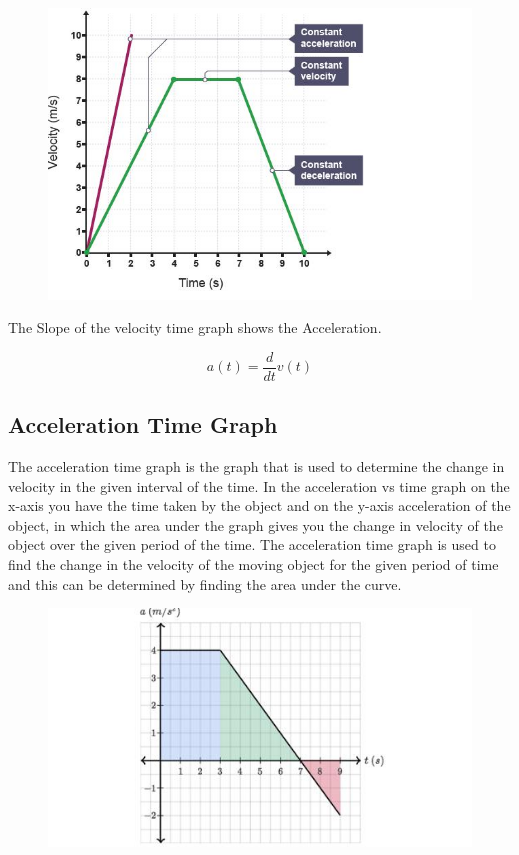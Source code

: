 \documentclass[11pt]{article}
\begin{document}
\begin{figure}[H]
	\centering
	\includegraphics[scale=0.45]{vt graph.jpg}
\end{figure}

\noindent
The Slope of the velocity time graph shows the Acceleration.

\begin{equation}
	a(t)=\frac{d}{d t} v(t)
\end{equation}

\subsection{Acceleration Time Graph}
The acceleration time graph is the graph that is used to determine the change in velocity in the given interval of the time. In the acceleration vs time graph on the x-axis you have the time taken by the object and on the y-axis acceleration of the object, in which the area under the graph gives you the change in velocity of the object over the given period of the time. The acceleration time graph is used to find the change in the velocity of the moving object for the given period of time and this can be determined by finding the area under the curve.

\begin{figure}[H]
	\centering
	\includegraphics[scale=0.5]{at graph.jpg}
	\label{fig: Polygon Law}
\end{figure}
\end{document}
